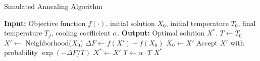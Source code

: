 \documentclass{article}
\begin{document}
	
	\begin{algorithm}
		\caption{Simulated Annealing Algorithm}
		\begin{algorithmic}[1]
			\State \textbf{Input:} Objective function $f(\cdot)$, initial solution $X_0$, initial temperature $T_0$, final temperature $T_f$, cooling coefficient $\alpha$.
			\State \textbf{Output:} Optimal solution $X^*$.
			\State $T \gets T_0$ 
			\State $X' \gets$ Neighborhood($X_0$) 
			\State $\Delta F \gets f(X') - f(X_0)$ 
			\State $X_0 \gets X'$ 
			\Else
			\State Accept $X'$ with probability $\exp(-\Delta F / T)$ 
			\EndIf
			\State $X^* \gets X'$ 
			\EndIf
			\EndFor
			\State $T \gets \alpha \cdot T$ 
			\EndWhile
			\State \Return $X^*$
		\end{algorithmic}
	\end{algorithm}
	
\end{document}
